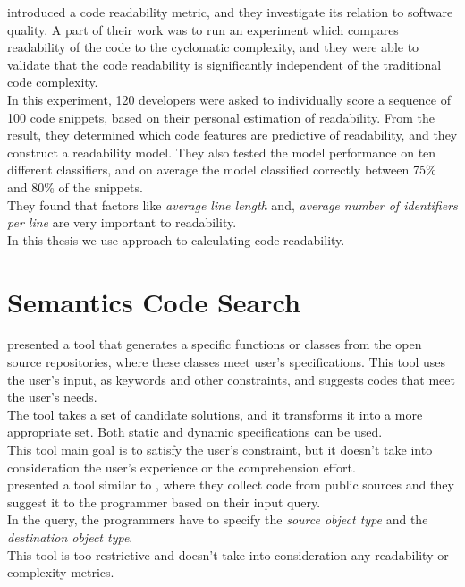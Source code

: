 \documentclass[12pt,mscthesis]{usiinfthesis}
\begin{document}
	\citet{Buse2010} introduced a code readability metric, and they investigate its relation to software quality. A part of their work was to run an experiment which compares readability of the code to the cyclomatic complexity, and they were able to validate that the code readability is significantly independent of the traditional code complexity.\\
	In this experiment, 120 developers were asked to individually score a sequence of 100 code snippets, based on their personal estimation of readability. From the result, they determined which code features are predictive of readability, and they construct a readability model. They also tested the model performance on ten different classifiers, and on average the model classified correctly between 75\% and 80\% of the snippets.\\
	They found that factors like \textit{average line length} and, \textit{average number of identifiers per line} are very important to readability.\\
	In this thesis we use \citet{Buse2010} approach to calculating code readability.

	\section{Semantics Code Search}

	\citet{Reiss:2009:SCS:1555001.1555040} presented a tool that generates a specific functions or classes from the open source repositories, where these classes meet user's specifications. This tool uses the user's input, as keywords and other constraints, and suggests codes that meet the user's needs.\\
	The tool takes a set of candidate solutions, and it transforms it into a more appropriate set. Both static and dynamic specifications can be used.\\
	This tool main goal is to satisfy the user's constraint, but it doesn't take into consideration the user's experience or the comprehension effort.\\
	

	\citet{Thummalapenta:2007:PPA:1321631.1321663} presented a tool similar to \citet{Reiss:2009:SCS:1555001.1555040}, where they collect code from public sources and they suggest it to the programmer based on their input query.\\ In the query, the programmers have to specify the \textit{source object type} and the \textit{destination object type}.\\ This tool is too restrictive and doesn't take into consideration any readability or complexity metrics.\\
\end{document}

